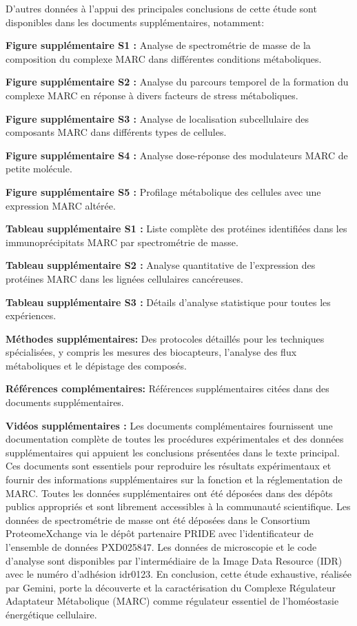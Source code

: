 \documentclass[11pt,a4paper]{article}
\begin{document}
D'autres données à l'appui des principales conclusions de cette étude sont disponibles dans les documents supplémentaires, notamment:

\textbf{Figure supplémentaire S1 :} Analyse de spectrométrie de masse de la composition du complexe MARC dans différentes conditions métaboliques.

\textbf{Figure supplémentaire S2 :} Analyse du parcours temporel de la formation du complexe MARC en réponse à divers facteurs de stress métaboliques.

\textbf{Figure supplémentaire S3 :} Analyse de localisation subcellulaire des composants MARC dans différents types de cellules.

\textbf{Figure supplémentaire S4 :} Analyse dose-réponse des modulateurs MARC de petite molécule.

\textbf{Figure supplémentaire S5 :} Profilage métabolique des cellules avec une expression MARC altérée.

\textbf{Tableau supplémentaire S1 :} Liste complète des protéines identifiées dans les immunoprécipitats MARC par spectrométrie de masse.

\textbf{Tableau supplémentaire S2 :} Analyse quantitative de l'expression des protéines MARC dans les lignées cellulaires cancéreuses.

\textbf{Tableau supplémentaire S3 :} Détails d'analyse statistique pour toutes les expériences.

\textbf{Méthodes supplémentaires:} Des protocoles détaillés pour les techniques spécialisées, y compris les mesures des biocapteurs, l'analyse des flux métaboliques et le dépistage des composés.

\textbf{Références complémentaires:} Références supplémentaires citées dans des documents supplémentaires.

\textbf{Vidéos supplémentaires :} Les documents complémentaires fournissent une documentation complète de toutes les procédures expérimentales et des données supplémentaires qui appuient les conclusions présentées dans le texte principal. Ces documents sont essentiels pour reproduire les résultats expérimentaux et fournir des informations supplémentaires sur la fonction et la réglementation de MARC. Toutes les données supplémentaires ont été déposées dans des dépôts publics appropriés et sont librement accessibles à la communauté scientifique. Les données de spectrométrie de masse ont été déposées dans le Consortium ProteomeXchange via le dépôt partenaire PRIDE avec l'identificateur de l'ensemble de données PXD025847. Les données de microscopie et le code d'analyse sont disponibles par l'intermédiaire de la Image Data Resource (IDR) avec le numéro d'adhésion idr0123. En conclusion, cette étude exhaustive, réalisée par Gemini, porte la découverte et la caractérisation du Complexe Régulateur Adaptateur Métabolique (MARC) comme régulateur essentiel de l'homéostasie énergétique cellulaire.
\end{document}

